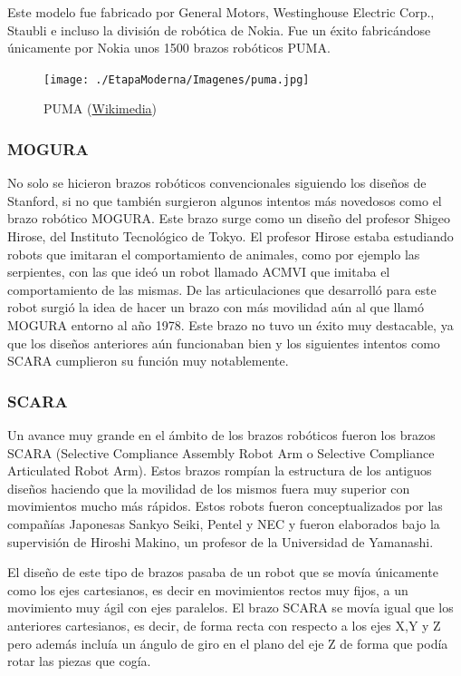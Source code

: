 \vspace{10px}

Este modelo fue fabricado por General Motors, Westinghouse Electric Corp., Staubli e incluso la división de robótica de Nokia. Fue un éxito fabricándose únicamente por Nokia unos 1500 brazos robóticos PUMA.

\begin{figure}[!h]
	\centering
	\texttt{[image: ./EtapaModerna/Imagenes/puma.jpg]}
	\caption{PUMA (\href{https://es.m.wikipedia.org/wiki/Archivo:Puma_Robotic_Arm_-_GPN-2000-001817.jpg}{Wikimedia})}
	\label{fig:puma}
\end{figure}

\subsubsection{MOGURA}

No solo se hicieron brazos robóticos convencionales siguiendo los diseños de Stanford, si no que también surgieron algunos intentos más novedosos como el brazo robótico MOGURA. Este brazo surge como un diseño del profesor Shigeo Hirose, del Instituto Tecnológico de Tokyo. El profesor Hirose estaba estudiando robots que imitaran el comportamiento de animales, como por ejemplo las serpientes, con las que ideó un robot llamado ACMVI que imitaba el comportamiento de las mismas. De las articulaciones que desarrolló para este robot surgió la idea de hacer un brazo con más movilidad aún al que llamó MOGURA entorno al año 1978. Este brazo no tuvo un éxito muy destacable, ya que los diseños anteriores aún funcionaban bien y los siguientes intentos como SCARA cumplieron su función muy notablemente.

\subsubsection{SCARA}
Un avance muy grande en el ámbito de los brazos robóticos fueron los brazos SCARA (Selective Compliance Assembly Robot Arm o Selective Compliance Articulated Robot Arm). Estos brazos rompían la estructura de los antiguos diseños haciendo que la movilidad de los mismos fuera muy superior con movimientos mucho más rápidos. Estos robots fueron conceptualizados por las compañías Japonesas Sankyo Seiki, Pentel y NEC y fueron elaborados bajo la supervisión de Hiroshi Makino, un profesor de la Universidad de Yamanashi.

\vspace{10px}

El diseño de este tipo de brazos pasaba de un robot que se movía únicamente como los ejes cartesianos, es decir en movimientos rectos muy fijos, a un movimiento muy ágil con ejes paralelos. El brazo SCARA se movía igual que los anteriores cartesianos, es decir, de forma recta con respecto a los ejes X,Y y Z pero además incluía un ángulo de giro en el plano del eje Z de forma que podía rotar las piezas que cogía.

